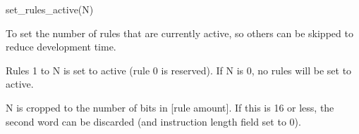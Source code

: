 

\format
set\_rules\_active(N)

\purpose

To set the number of rules that are currently active, so others can be skipped to reduce development time.

\description

Rules 1 to N is set to active (rule 0 is reserved).
If N is 0, no rules will be set to active.

\notes

N is cropped to the number of bits in [rule amount].
If this is 16 or less, the second word can be discarded (and instruction length field set to 0).
